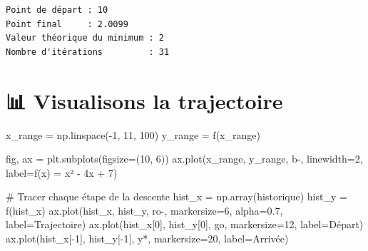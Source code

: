 \documentclass[
  french,
  11pt,
  a4paper,
]{scrbook}
\newenvironment{Shaded}{}{}
\newcommand{\CommentTok}[1]{\textcolor[rgb]{0.42,0.45,0.49}{#1}}
\newcommand{\DecValTok}[1]{\textcolor[rgb]{0.00,0.36,0.77}{#1}}
\newcommand{\FloatTok}[1]{\textcolor[rgb]{0.00,0.36,0.77}{#1}}
\newcommand{\NormalTok}[1]{\textcolor[rgb]{0.14,0.16,0.18}{#1}}
\newcommand{\OperatorTok}[1]{\textcolor[rgb]{0.14,0.16,0.18}{#1}}
\newcommand{\StringTok}[1]{\textcolor[rgb]{0.01,0.18,0.38}{#1}}
\begin{document}
\begin{verbatim}
Point de départ : 10
Point final     : 2.0099
Valeur théorique du minimum : 2
Nombre d'itérations         : 31
\end{verbatim}

\section{📊 Visualisons la
trajectoire}\label{visualisons-la-trajectoire}

\begin{Shaded}
\begin{Highlighting}[]
\NormalTok{x\_range }\OperatorTok{=}\NormalTok{ np.linspace(}\OperatorTok{{-}}\DecValTok{1}\NormalTok{, }\DecValTok{11}\NormalTok{, }\DecValTok{100}\NormalTok{)}
\NormalTok{y\_range }\OperatorTok{=}\NormalTok{ f(x\_range)}

\NormalTok{fig, ax }\OperatorTok{=}\NormalTok{ plt.subplots(figsize}\OperatorTok{=}\NormalTok{(}\DecValTok{10}\NormalTok{, }\DecValTok{6}\NormalTok{))}
\NormalTok{ax.plot(x\_range, y\_range, }\StringTok{\textquotesingle{}b{-}\textquotesingle{}}\NormalTok{, linewidth}\OperatorTok{=}\DecValTok{2}\NormalTok{, label}\OperatorTok{=}\StringTok{\textquotesingle{}f(x) = x² {-} 4x + 7\textquotesingle{}}\NormalTok{)}

\CommentTok{\# Tracer chaque étape de la descente}
\NormalTok{hist\_x }\OperatorTok{=}\NormalTok{ np.array(historique)}
\NormalTok{hist\_y }\OperatorTok{=}\NormalTok{ f(hist\_x)}
\NormalTok{ax.plot(hist\_x, hist\_y, }\StringTok{\textquotesingle{}ro{-}\textquotesingle{}}\NormalTok{, markersize}\OperatorTok{=}\DecValTok{6}\NormalTok{, alpha}\OperatorTok{=}\FloatTok{0.7}\NormalTok{, label}\OperatorTok{=}\StringTok{\textquotesingle{}Trajectoire\textquotesingle{}}\NormalTok{)}
\NormalTok{ax.plot(hist\_x[}\DecValTok{0}\NormalTok{], hist\_y[}\DecValTok{0}\NormalTok{], }\StringTok{\textquotesingle{}go\textquotesingle{}}\NormalTok{, markersize}\OperatorTok{=}\DecValTok{12}\NormalTok{, label}\OperatorTok{=}\StringTok{\textquotesingle{}Départ\textquotesingle{}}\NormalTok{)}
\NormalTok{ax.plot(hist\_x[}\OperatorTok{{-}}\DecValTok{1}\NormalTok{], hist\_y[}\OperatorTok{{-}}\DecValTok{1}\NormalTok{], }\StringTok{\textquotesingle{}y*\textquotesingle{}}\NormalTok{, markersize}\OperatorTok{=}\DecValTok{20}\NormalTok{, label}\OperatorTok{=}\StringTok{\textquotesingle{}Arrivée\textquotesingle{}}\NormalTok{)}


\end{Highlighting}
\end{Shaded}
\end{document}
